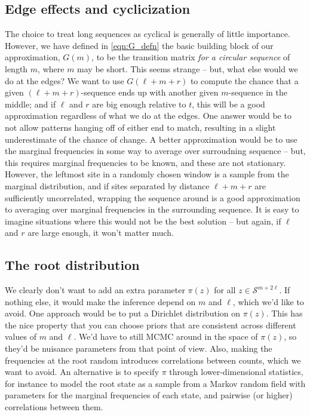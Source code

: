 \documentclass{article}
\newcommand{\peter}[1]{\todo[color=green!40]{Peter: #1}}
\newcommand{\calS}{\mathcal{S}}  %
\theoremstyle{plain}
\theoremstyle{definition}
\begin{document}
\subsection{Edge effects and cyclicization}

The choice to treat long sequences as cyclical is generally of little importance.
However, we have defined in \eqref{eqn:G_defn} the basic building block of our approximation, $G(m)$,
to be the transition matrix \emph{for a circular sequence} of length $m$, where $m$ may be short.
\peter{no we haven't}
This seems strange -- but, what else would we do at the edges?
We want to use $G(\ell+m+r)$ to compute the chance that a given $(\ell+m+r)$-sequence ends up with another given $m$-sequence in the middle;
and if $\ell$ and $r$ are big enough relative to $t$, this will be a good approximation regardless of what we do at the edges.
One answer would be to not allow patterns hanging off of either end to match,
resulting in a slight underestimate of the chance of change.
A better approximation would be to use the marginal frequencies in some way to average over surroudning sequence
-- but, this requires marginal frequencies to be known, and these are not stationary.
However, the leftmost site in a randomly chosen window is a sample from the marginal distribution,
and if sites separated by distance $\ell+m+r$ are sufficiently uncorrelated,
wrapping the sequence around is a good approximation to averaging over marginal frequencies in the surrounding sequence.
It is easy to imagine situations where this would not be the best solution --
but again, if $\ell$ and $r$ are large enough, it won't matter much.

\subsection{The root distribution}

We clearly don't want to add an extra parameter $\pi(z)$ for all $z \in \calS^{m+2\ell}$.
If nothing else, it would make the inference depend on $m$ and $\ell$, which we'd like to avoid.
One approach would be to put a Dirichlet distribution on $\pi(z)$.
This has the nice property that you can choose priors that are consistent across different values of $m$ and $\ell$.
We'd have to still MCMC around in the space of $\pi(z)$, so they'd be nuisance parameters from that point of view.
Also, making the frequencies at the root random introduces correlations between counts, which we want to avoid.
An alternative is to specify $\pi$ through lower-dimensional statistics,
for instance to model the root state as a sample from a Markov random field
with parameters for the marginal frequencies of each state, and pairwise (or higher) correlations between them.
\end{document}
